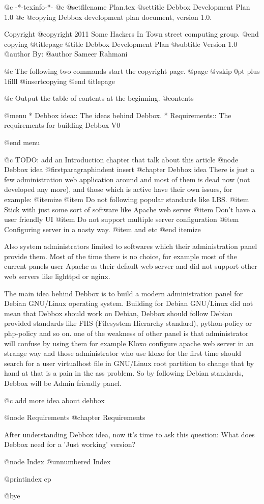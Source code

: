    @c -*-texinfo-*-
@c %
@setfilename Plan.tex
@settitle Debbox Development Plan 1.0
@c %
@copying
Debbox development plan document, version 1.0.

Copyright @copyright{} 2011 Some Hackers In Town street computing group.
@end copying
@titlepage
@title Debbox Development Plan
@subtitle Version 1.0
@author By:
@author Sameer Rahmani

@c The following two commands start the copyright page.
@page
@vskip 0pt plus 1filll
@insertcopying
@end titlepage

@c Output the table of contents at the beginning.
@contents

@menu
* Debbox idea::    The ideas behind Debbox.
* Requirements::   The requirements for building Debbox V0

@end menu

@c TODO: add an Introduction chapter that talk about this article
@node Debbox idea
@firstparagraphindent insert
@chapter Debbox idea
There is just a few administration web application around and most of them is dead now (not developed any more), and those
which is active have their own issues, for example:
@itemize
@item
Do not following popular standards like LBS.
@item
Stick with just some sort of software like Apache web server
@item
Don't have a user friendly UI
@item
Do not support multiple server configuration
@item 
Configuring server in a nasty way.
@item
and etc
@end itemize

Also system administrators limited to softwares which their administration panel provide them.
Most of the time there is no choice, for example most of the current panels user Apache as their
default web server and did not support other web servers like lighttpd or nginx.

The main idea behind Debbox is to build a modern administration panel for Debian GNU/Linux operating 
system. Building for Debian GNU/Linux did not mean that Debbox should work on Debian, Debbox should
follow Debian provided standards like FHS (Filesystem Hierarchy standard), python-policy or php-policy
and so on. one of the weakness of other panel is that administrator will confuse by using them for example
Kloxo configure apache web server in an strange way and those administrator who use kloxo for the first time
should search for a user virtualhost file in GNU/Linux root partition to change that by hand at that is a pain 
in the ass problem. So by following Debian standards, Debbox will be Admin friendly panel. 

@c add more idea about debbox       

@node Requirements
@chapter Requirements

After understanding Debbox idea, now it's time to ask this question: What does Debbox need for a 'Just working' version?


@node Index
@unnumbered Index

@printindex cp

@bye
